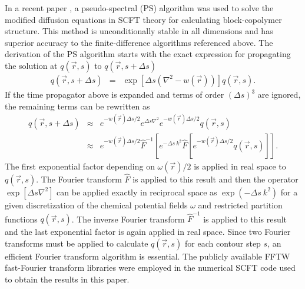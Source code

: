 \documentclass[onecolumn,amsmath,amssymb,floatfix]{elsart}
\begin{document}
In a recent paper \cite{lookman02}, a pseudo-spectral (PS) algorithm was used to
solve the modified diffusion equations in SCFT theory for calculating
block-copolymer structure.
This method is unconditionally stable in all dimensions and has superior accuracy
to the finite-difference algorithms referenced above.
The derivation of the PS algorithm starts with the
exact expression for propagating the solution at $q({\vec r},s)$ to
$q({\vec r},s+\Delta s)$
%
 \begin{eqnarray*}
 \label{eqn_pseudospec_1}
  q({\vec r},s + \Delta s)
  & = &
   \exp \left[\Delta s (\nabla^2 - w({\vec r})) \right ]
   q({\vec r},s) .
 \end{eqnarray*}
%
If the time propagator above is expanded and terms of order
$(\Delta s)^3$ are ignored, the remaining terms can be rewritten as
%
 \begin{eqnarray*}
 \label{eqn_pseudospec_2}
  q({\vec r},s + \Delta s)
  & \approx &
   e^{- w({\vec r}) \Delta s / 2} e^{\Delta s \nabla^2}
   e^{- w({\vec r}) \Delta s / 2}
   q({\vec r},s) \\
  & \approx &
  \label{eqn_pseudospec_3}
   e^{- w({\vec r}) \Delta s / 2} {\hat F}^{-1}
   \left [ e^{- \Delta s \ k^2}
   {\hat F}
    \left  [ e^{- w({\vec r}) \Delta s / 2} q({\vec r},s)
    \right ]
   \right ] .
 \end{eqnarray*}
%
The first exponential factor depending on $\omega({\vec r})/2$ is applied
in real space to $q({\vec r},s)$.
The Fourier transform ${\hat F}$ is applied to this result and then
the operator $\exp[\Delta s \nabla^2]$ can be applied exactly in reciprocal
space as $\exp(-\Delta s \ k^2)$
for a given discretization of the chemical potential fields $\omega$ and
restricted partition functions $q({\vec r},s)$.
The inverse Fourier transform ${\hat F}^{-1}$ is applied to this result
and the last exponential factor is again applied in real space.
Since two Fourier transforms must be applied to calculate $q({\vec r},s)$ for each
contour step $s$, an efficient Fourier transform algorithm is essential.
The publicly available FFTW \cite{fftw98} fast-Fourier transform libraries
were employed in the numerical SCFT code used to obtain the
results in this paper.
\end{document}
